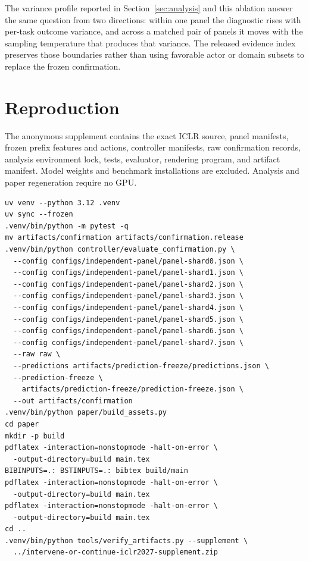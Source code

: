 

The variance profile reported in Section~\ref{sec:analysis} and this ablation answer the same question from two directions: within one panel the diagnostic rises with per-task outcome variance, and across a matched pair of panels it moves with the sampling temperature that produces that variance. The released evidence index preserves those boundaries rather than using favorable actor or domain subsets to replace the frozen confirmation.

\section{Reproduction}
\label{app:repro}

The anonymous supplement contains the exact ICLR source, panel manifests, frozen prefix features and actions, controller manifests, raw confirmation records, analysis environment lock, tests, evaluator, rendering program, and artifact manifest. Model weights and benchmark installations are excluded. Analysis and paper regeneration require no GPU.

\begin{verbatim}
uv venv --python 3.12 .venv
uv sync --frozen
.venv/bin/python -m pytest -q
mv artifacts/confirmation artifacts/confirmation.release
.venv/bin/python controller/evaluate_confirmation.py \
  --config configs/independent-panel/panel-shard0.json \
  --config configs/independent-panel/panel-shard1.json \
  --config configs/independent-panel/panel-shard2.json \
  --config configs/independent-panel/panel-shard3.json \
  --config configs/independent-panel/panel-shard4.json \
  --config configs/independent-panel/panel-shard5.json \
  --config configs/independent-panel/panel-shard6.json \
  --config configs/independent-panel/panel-shard7.json \
  --raw raw \
  --predictions artifacts/prediction-freeze/predictions.json \
  --prediction-freeze \
    artifacts/prediction-freeze/prediction-freeze.json \
  --out artifacts/confirmation
.venv/bin/python paper/build_assets.py
cd paper
mkdir -p build
pdflatex -interaction=nonstopmode -halt-on-error \
  -output-directory=build main.tex
BIBINPUTS=.: BSTINPUTS=.: bibtex build/main
pdflatex -interaction=nonstopmode -halt-on-error \
  -output-directory=build main.tex
pdflatex -interaction=nonstopmode -halt-on-error \
  -output-directory=build main.tex
cd ..
.venv/bin/python tools/verify_artifacts.py --supplement \
  ../intervene-or-continue-iclr2027-supplement.zip
\end{verbatim}

